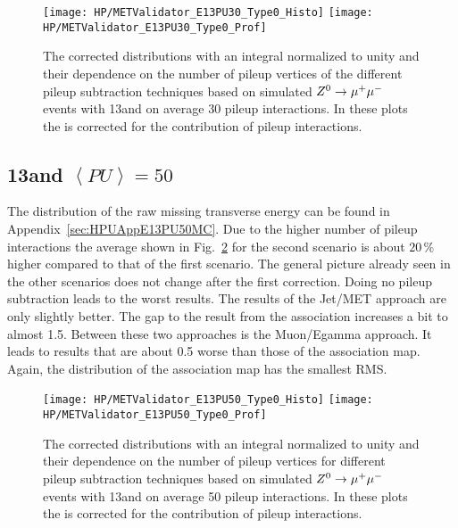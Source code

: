 \begin{figure}[h!t]
  \centering
  \texttt{[image: HP/METValidator\_E13PU30\_Type0\_Histo]}
  \texttt{[image: HP/METValidator\_E13PU30\_Type0\_Prof]}
  \caption[The corrected \MET{} distributions and their dependence on the number of pileup vertices for different pileup subtraction techniques based on simulated  $\Zz\rightarrow\MM$ events with 13\TeV and PU=30]{The corrected \MET{} distributions with an integral normalized to unity and their dependence on the number of pileup vertices of the different pileup subtraction techniques based on simulated  $\Zz\rightarrow\MM$ events with 13\TeV and on average 30 pileup interactions. In these plots the \MET{} is corrected for the contribution of pileup interactions. \label{plot:HPUMETE13PU30T0}}
\end{figure}

\subsection{13\TeV and $\left<PU\right> =50$ \label{sec:HPUMETE13PU50}}

The distribution of the raw missing transverse energy can be found in Appendix~\ref{sec:HPUAppE13PU50MC}. Due to the higher number of pileup interactions the average \MET{} shown in Fig.~\ref{plot:HPUMETE13PU50T0} for the second scenario is about $20\,\%$ higher compared to that of the first scenario. The general picture already seen in the other scenarios does not change after the first correction. Doing no pileup subtraction leads to the worst results. The results of the Jet/MET approach are only slightly better. The gap to the result from the association increases a bit to almost 1.5\GeV{}. Between these two approaches is the Muon/Egamma approach. It leads to results that are about 0.5\GeV{} worse than those of the association map. Again, the distribution of the association map has the smallest RMS.

\begin{figure}[h!t]
  \centering
  \texttt{[image: HP/METValidator\_E13PU50\_Type0\_Histo]}
  \texttt{[image: HP/METValidator\_E13PU50\_Type0\_Prof]}
  \caption[The corrected \MET{} distributions and their dependence on the number of pileup vertices for different pileup subtraction techniques based on simulated  $\Zz\rightarrow\MM$ events with 13\TeV and PU=50]{The corrected \MET{} distributions with an integral normalized to unity and their dependence on the number of pileup vertices for different pileup subtraction techniques based on simulated  $\Zz\rightarrow\MM$ events with 13\TeV and on average 50 pileup interactions. In these plots the \MET{} is corrected for the contribution of pileup interactions. \label{plot:HPUMETE13PU50T0}}
\end{figure}

